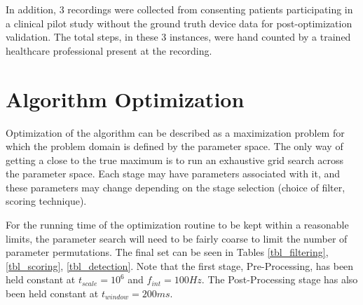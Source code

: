             In addition, 3 recordings were collected from consenting patients participating in a clinical pilot study without the ground truth device data for post-optimization validation. The total steps, in these 3 instances, were hand counted by a trained healthcare professional present at the recording.

    \chapter{Algorithm Optimization}

         Optimization of the algorithm can be described as a maximization problem for which the problem domain is defined by the parameter space. The only way of getting a close to the true maximum is to run an exhaustive grid search across the parameter space. Each stage may have parameters associated with it, and these parameters may change depending on the stage selection (choice of filter, scoring technique). 

        For the running time of the optimization routine to be kept within a reasonable limits, the parameter search will need to be fairly coarse to limit the number of parameter permutations. The final set can be seen in Tables \ref{tbl_filtering}, \ref{tbl_scoring}, \ref{tbl_detection}. Note that the first stage, Pre-Processing, has been held constant at $t_{scale}=10^6$ and $f_{int}=100Hz$. The Post-Processing stage has also been held constant at $t_{window}=200ms$. 


